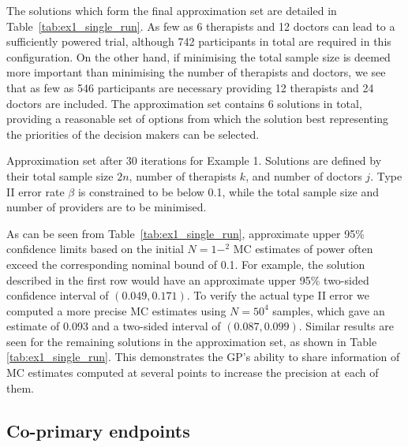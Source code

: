 \documentclass[sagev]{sagej}
\begin{document}
The solutions which form the final approximation set are detailed in Table~\ref{tab:ex1_single_run}. As few as 6 therapists and 12 doctors can lead to a sufficiently powered trial, although 742 participants in total are required in this configuration. On the other hand, if minimising the total sample size is deemed more important than minimising the number of therapists and doctors, we see that as few as 546 participants are necessary providing 12 therapists and 24 doctors are included. The approximation set contains 6 solutions in total, providing a reasonable set of options from which the solution best representing the priorities of the decision makers can be selected.

\begin{table}
\small\sf\centering
\caption{Approximation set after 30 iterations for Example 1. Solutions are defined by their total sample size $2n$, number of therapists $k$, and number of doctors $j$. Type II error rate $\beta$ is constrained to be below 0.1, while the total sample size and number of providers are to be minimised.}

\label{tab:ex1_single_run}
\end{table}

As can be seen from Table~\ref{tab:ex1_single_run}, approximate upper 95\% confidence limits based on the initial $N = 1-^2$ MC estimates of power often exceed the corresponding nominal bound of 0.1. For example, the solution described in the first row would have an approximate upper 95\% two-sided confidence interval of $(0.049, 0.171)$. To verify the actual type II error we computed a more precise MC estimates  using $N = 50^4$ samples, which gave an estimate of 0.093 and a two-sided interval of $(0.087, 0.099)$. Similar results are seen for the remaining solutions in the approximation set, as shown in Table \ref{tab:ex1_single_run}. This demonstrates the GP's ability to share information of MC estimates computed at several points to increase the precision at each of them.


\subsection{Co-primary endpoints}
\end{document}
